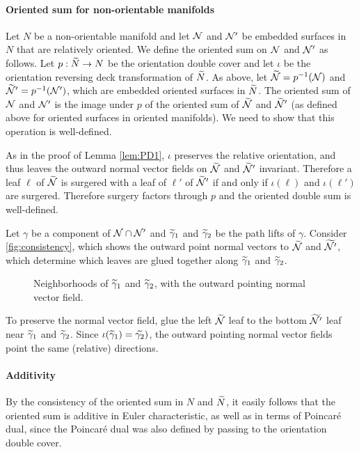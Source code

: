 \paragraph{Oriented sum for non-orientable manifolds}

Let $N$ be a non-orientable manifold and let $\mathcal{N}$ and $\mathcal{N}'$ be embedded surfaces in $N$ that are relatively oriented.
We define the oriented sum on $\mathcal{N}$ and $\mathcal{N}'$ as follows.
Let $p:\widetilde{N}\rightarrow N$ be the orientation double cover and let $\iota$ be the orientation reversing deck transformation of $\widetilde{N}$.
As above, let $\widetilde{\mathcal{N}}=p^{-1}(\mathcal{N})$ and $\widetilde{\mathcal{N}}'=p^{-1}(\mathcal{N}')$, which are embedded oriented surfaces in $\widetilde{N}$.
The oriented sum of $\mathcal{N}$ and $\mathcal{N}'$ is the image under $p$ of the oriented sum of $\widetilde{\mathcal{N}}$ and $\widetilde{\mathcal{N}}'$ (as defined above for oriented surfaces in oriented manifolds).
We need to show that this operation is well-defined.

As in the proof of Lemma \ref{lem:PD1}, $\iota$ preserves the relative orientation, and thus leaves the outward normal vector fields on $\widetilde{\mathcal{N}}$ and $\widetilde{\mathcal{N}}'$ invariant.
Therefore a leaf $\ell$ of $\widetilde{\mathcal{N}}$ is surgered with a leaf of $\ell'$ of $\widetilde{\mathcal{N}}'$ if and only if $\iota(\ell)$ and $\iota(\ell')$ are surgered.
Therefore surgery factors through $p$ and the oriented double sum is well-defined.

\begin{example}
  Let $\gamma$ be a component of $\mathcal{N}\cap \mathcal{N}'$ and $\widetilde{\gamma}_1$ and $\widetilde{\gamma}_2$ be the path lifts of $\gamma$.
  Consider \autoref{fig:consistency}, which shows the outward point normal vectors to $\widetilde{\mathcal{N}}$ and $\widetilde{\mathcal{N}'}$, which determine which leaves are glued together along $\widetilde{\gamma}_1$ and $\widetilde{\gamma}_2$.

\begin{figure}
  \centering
  \caption{Neighborhoods of $\widetilde{\gamma}_1$ and $\widetilde{\gamma}_2$, with the outward pointing normal vector field.}
  \label{fig:consistency}
\end{figure}

To preserve the normal vector field, glue the left $\widetilde{\mathcal{N}}$ leaf to the bottom $\widetilde{\mathcal{N}'}$ leaf near $\widetilde{\gamma}_1$ and $\widetilde{\gamma}_2$.
Since $\iota(\widetilde{\gamma}_1)=\widetilde{\gamma_2})$, the outward pointing normal vector fields point the same (relative) directions.
\end{example}

\paragraph{Additivity}

By the consistency of the oriented sum in $N$ and $\widetilde{N}$, it easily follows that the oriented sum is additive in Euler characteristic, as well as in terms of Poincar\'e dual, since the Poincar\'e dual was also defined by passing to the orientation double cover.
